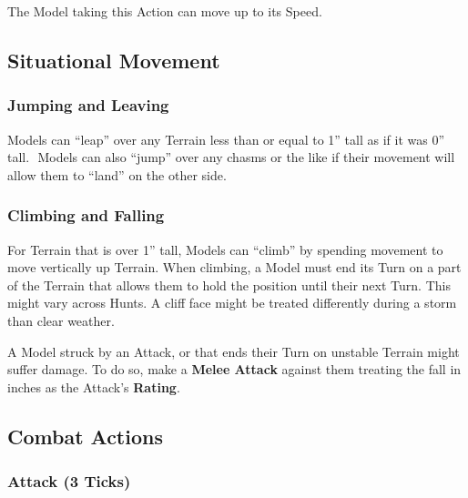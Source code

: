 \documentclass[
]{book}
\begin{document}
The Model taking this Action can move up to its Speed.

\hypertarget{situational-movement}{%
\subsection{Situational Movement}\label{situational-movement}}

\hypertarget{jumping-and-leaving}{%
\subsubsection*{Jumping and Leaving}\label{jumping-and-leaving}}

Models can ``leap'' over any Terrain less than or equal to 1'' tall as if it was 0'' tall.  Models can also ``jump'' over any chasms or the like if their movement will allow them to ``land'' on the other side.

\hypertarget{climbing-and-falling}{%
\subsubsection*{Climbing and Falling}\label{climbing-and-falling}}

For Terrain that is over 1'' tall, Models can ``climb'' by spending movement to move vertically up Terrain. When climbing, a Model must end its Turn on a part of the Terrain that allows them to hold the position until their next Turn. This might vary across Hunts. A cliff face might be treated differently during a storm than clear weather.  

A Model struck by an Attack, or that ends their Turn on unstable Terrain might suffer damage. To do so, make a \textbf{Melee Attack} against them treating the fall in inches as the Attack's \textbf{Rating}.

\hypertarget{combat-actions}{%
\subsection{Combat Actions}\label{combat-actions}}

\hypertarget{attack-3-ticks}{%
\subsubsection*{Attack (3 Ticks)}\label{attack-3-ticks}}
\end{document}
